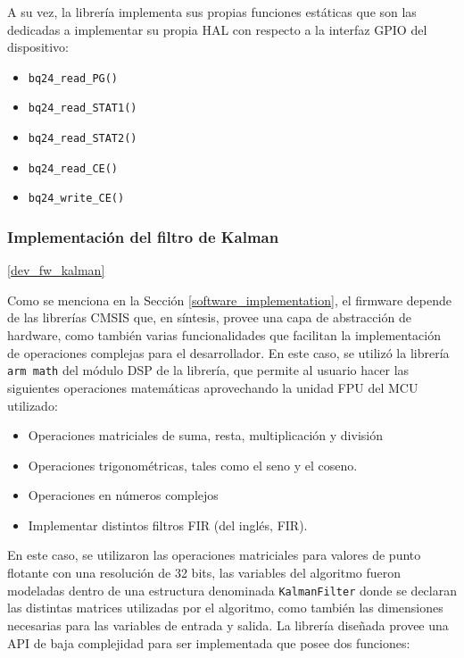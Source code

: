 \documentclass[10pt, a4paper]{article}
\begin{document}
A su vez, la librer\'ia implementa sus propias funciones est\'aticas que son las
dedicadas a implementar su propia \acrshort{HAL} con respecto a la interfaz
\acrshort{GPIO} del dispositivo: 

\begin{itemize}
    \item \texttt{bq24\_read\_PG()}
    \item \texttt{bq24\_read\_STAT1()}
    \item \texttt{bq24\_read\_STAT2()}
    \item \texttt{bq24\_read\_CE()}
    \item \texttt{bq24\_write\_CE()}
\end{itemize}

\subsubsection{Implementaci\'on del filtro de Kalman}\ref{dev_fw_kalman}

Como se menciona en la Secci\'on \ref{software_implementation}, el firmware
depende de las librer\'ias \acrshort{CMSIS} que, en s\'intesis, provee una capa de 
abstracci\'on de hardware, como tambi\'en varias funcionalidades que facilitan 
la implementaci\'on de operaciones complejas para el desarrollador. En este 
caso, se utiliz\'o la librer\'ia \texttt{arm math} del m\'odulo \acrshort{DSP} 
de la librer\'ia, que permite al usuario hacer las siguientes  operaciones 
matem\'aticas aprovechando la unidad \acrshort{FPU} del \acrshort{MCU} 
utilizado:

\begin{itemize}
    \item Operaciones matriciales de suma, resta, multiplicaci\'on y divisi\'on
    \item Operaciones trigonom\'etricas, tales como el seno y el coseno.
    \item Operaciones en n\'umeros complejos
    \item Implementar distintos filtros \acrshort{FIR} (del ingl\'es,
        \acrlong{FIR}).
\end{itemize}

En este caso, se utilizaron las operaciones matriciales para valores de punto
flotante con una resoluci\'on de 32 bits, las variables del algoritmo fueron
modeladas dentro de una estructura denominada \texttt{KalmanFilter} donde se
declaran las distintas matrices utilizadas por el algoritmo, como tambi\'en las
dimensiones necesarias para las variables de entrada y salida. La librer\'ia 
diseñada provee una \acrshort{API} de baja complejidad para ser implementada que 
posee dos funciones:
\end{document}
